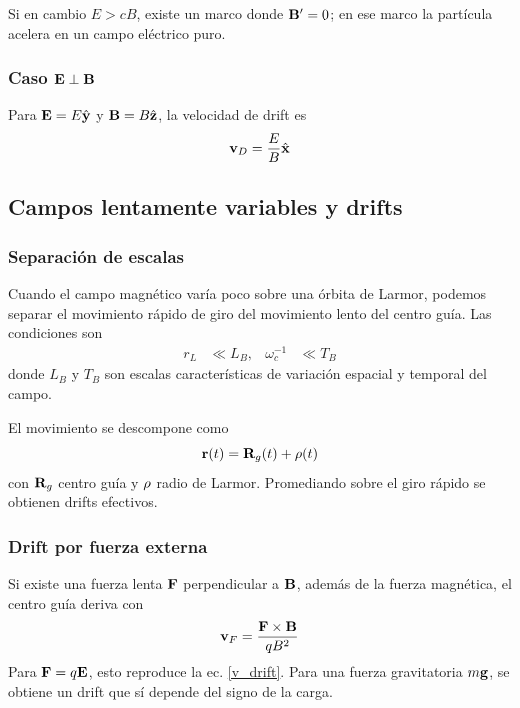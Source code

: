 \documentclass[]{article}
\numberwithin{equation}{section}
\begin{document}
Si en cambio $E > cB$, existe un marco donde $\mathbf{B}' = 0$; en ese marco la partícula acelera en un campo eléctrico puro.

\subsubsection{Caso $\mathbf{E} \perp \mathbf{B}$}
Para $\mathbf{E} = E \hat{\mathbf{y}}$ y $\mathbf{B} = B \hat{\mathbf{z}}$, la velocidad de drift es
\begin{equation}
	\mathbf{v}_D = \frac{E}{B} \hat{\mathbf{x}}
\end{equation}

\subsection{Campos lentamente variables y drifts}
\subsubsection{Separación de escalas}
Cuando el campo magnético varía poco sobre una órbita de Larmor, podemos separar el movimiento rápido de giro del movimiento lento del centro guía. Las condiciones son
\begin{align}
	r_L &\ll L_B, & \omega_c^{-1} &\ll T_B 
\end{align}
donde $L_B$ y $T_B$ son escalas características de variación espacial y temporal del campo.

El movimiento se descompone como
\begin{equation}
	\mathbf{r}(t) = \mathbf{R}_g(t) + \mathbf{\rho}(t)
\end{equation}
con $\mathbf{R}_g$ centro guía y $\mathbf{\rho}$ radio de Larmor. Promediando sobre el giro rápido se obtienen drifts efectivos.

\subsubsection{Drift por fuerza externa}
Si existe una fuerza lenta $\mathbf{F}$ perpendicular a $\mathbf{B}$, además de la fuerza magnética, el centro guía deriva con
\begin{equation}
	\mathbf{v}_F = \frac{\mathbf{F}\times\mathbf{B}}{qB^2}
\end{equation}
Para $\mathbf{F} = q \mathbf{E}$, esto reproduce la ec. \ref{v_drift}. Para una fuerza gravitatoria $m \mathbf{g}$, se obtiene un drift que sí depende del signo de la carga.
\end{document}
